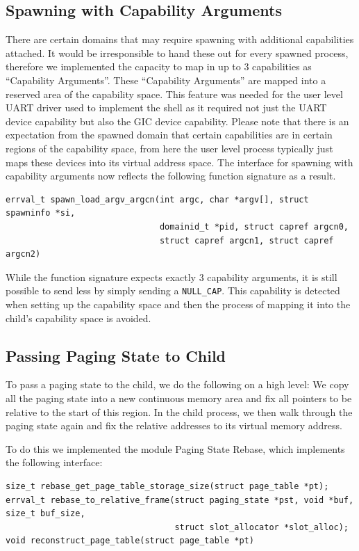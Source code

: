 \subsection{Spawning with Capability Arguments}
\label{sec:spawn_capargs}
There are certain domains that may require spawning with additional capabilities attached. It would be irresponsible to hand these out for every spawned process, therefore we implemented the capacity to map in up to 3 capabilities as ``Capability Arguments''. These ``Capability Arguments'' are mapped into a reserved area of the capability space. This feature was needed for the user level UART driver used to implement the shell as it required not just the UART device capability but also the GIC device capability. Please note that there is an expectation from the spawned domain that certain  capabilities are in certain regions of the capability space, from here the user level process typically just maps these devices into its virtual address space. The interface for spawning with capability arguments now reflects the following function signature as a result. 
\begin{verbatim}
errval_t spawn_load_argv_argcn(int argc, char *argv[], struct spawninfo *si,
                               domainid_t *pid, struct capref argcn0,
                               struct capref argcn1, struct capref argcn2)
\end{verbatim}
While the function signature expects exactly 3 capability arguments, it is still possible to send less by simply sending a \texttt{NULL_CAP}. This capability is detected when setting up the capability space and then the process of mapping it into the child's capability space is avoided. 


\subsection{Passing Paging State to Child}

To pass a paging state to the child, we do the following on a high level: We copy all the paging state into a new continuous memory area and fix all pointers to be relative to the start of this region. In the child process, we then walk through the paging state again and fix the relative addresses to its virtual memory address. 

To do this we implemented the module Paging State Rebase, which implements the following interface:
\begin{verbatim}
size_t rebase_get_page_table_storage_size(struct page_table *pt);
errval_t rebase_to_relative_frame(struct paging_state *pst, void *buf, size_t buf_size,
                                  struct slot_allocator *slot_alloc);
void reconstruct_page_table(struct page_table *pt)
\end{verbatim}

